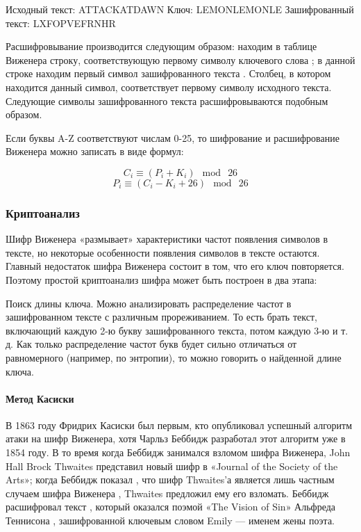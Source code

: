 Исходный текст:      ATTACKATDAWN
Ключ:                LEMONLEMONLE
Зашифрованный текст: LXFOPVEFRNHR

Расшифровывание производится следующим образом: находим в таблице 
Виженера строку, соответствующую первому символу ключевого слова
; в данной строке находим первый символ зашифрованного текста
. Столбец, в котором находится данный символ, соответствует первому 
символу исходного текста. Следующие символы зашифрованного текста 
расшифровываются подобным образом.

Если буквы A-Z соответствуют числам 0-25, то шифрование и расшифрование Виженера 
можно записать в виде формул:

    $$C_i \equiv (P_i + K_i) \mod\ 26$$
    $$P_i \equiv (C_i - K_i + 26) \mod\ 26$$

\subsubsection{Криптоанализ}

Шифр Виженера «размывает» характеристики частот появления символов 
в тексте, но некоторые особенности появления символов в тексте 
остаются. Главный недостаток шифра Виженера состоит в том, что 
его ключ повторяется. Поэтому простой криптоанализ шифра может 
быть построен в два этапа:

Поиск длины ключа. Можно анализировать распределение частот в 
зашифрованном тексте с различным прореживанием. То есть брать 
текст, включающий каждую 2-ю букву зашифрованного текста, потом 
каждую 3-ю и т. д. Как только распределение частот букв будет 
сильно отличаться от равномерного (например, по энтропии), то 
можно говорить о найденной длине ключа.

\paragraph{Метод Касиски}

В 1863 году Фридрих Касиски был первым, кто опубликовал успешный 
алгоритм атаки на шифр Виженера, хотя Чарльз Беббидж разработал 
этот алгоритм уже в 1854 году. В то время когда Беббидж занимался 
взломом шифра Виженера, John Hall Brock Thwaites представил новый 
шифр в «Journal of the Society of the Arts»; когда Беббидж показал
, что шифр Thwaites’а является лишь частным случаем шифра Виженера
, Thwaites предложил ему его взломать. Беббидж расшифровал текст
, который оказался поэмой «The Vision of Sin» Альфреда Теннисона
, зашифрованной ключевым словом Emily — именем жены поэта.

